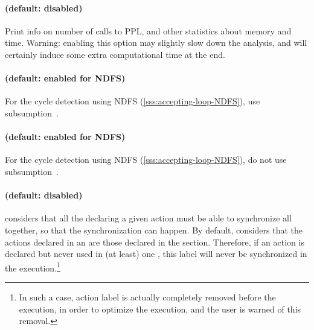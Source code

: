 \paragraph{ (default: disabled)}
Print info on number of calls to PPL, and other statistics about memory and time.
Warning: enabling this option may slightly slow down the analysis, and will certainly induce some extra computational time at the end.



\paragraph{ (default: enabled for NDFS)}
For the cycle detection using NDFS (\cref{sss:accepting-loop-NDFS}), use subsumption~\cite{NPP18}.


\paragraph{ (default: enabled for NDFS)}
For the cycle detection using NDFS (\cref{sss:accepting-loop-NDFS}), do not use subsumption~\cite{NPP18}.


\paragraph{ (default: disabled)}
\imitator{} considers that all the \IPTA{} declaring a given action must be able to synchronize all together, so that the synchronization can happen.
By default, \imitator{} considers that the actions declared in an \IPTA{} are those declared in the  section.
Therefore, if an action is declared but never used in (at least) one \IPTA{}, this label will never be synchronized in the execution.\footnote{In such a case, action label is actually completely removed before the execution, in order to optimize the execution, and the user is warned of this removal.}

